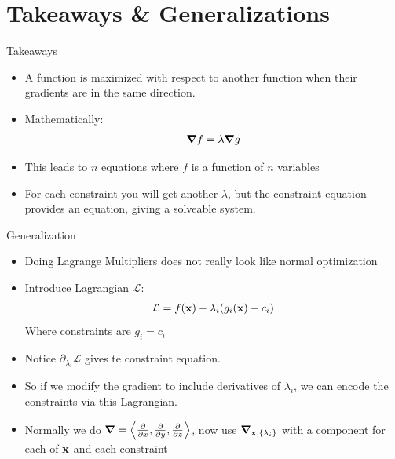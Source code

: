 \documentclass{beamer}
\newcommand{\D}{\partial}
\renewcommand{\L}{\mathcal{L}}
\begin{document}
\section{Takeaways \& Generalizations}
\begin{frame}{Takeaways}
  \begin{itemize}
  \item A function is maximized with respect to another function when their gradients are in the same direction.
  \item Mathematically:
    \begin{align*}
      \grad{f}=\lambda\grad{g}
    \end{align*}
  \item This leads to $n$ equations where $f$ is a function of $n$ variables
  \item For each constraint you will get another $\lambda$, but the constraint equation provides an equation, giving a solveable system. 
  \end{itemize}
\end{frame}
\begin{frame}{Generalization}
  \begin{itemize}
  \item Doing Lagrange Multipliers does not really look like normal optimization
  \item Introduce Lagrangian $\L$:
    \begin{align*}
      \L=f(\vb{x})-\lambda_i(g_i(\vb{x})-c_i)
    \end{align*}
    Where constraints are $g_i=c_i$
  \item Notice $\D_{\lambda_i}\L$ gives te constraint equation.
  \item So if we modify the gradient to include derivatives of $\lambda_i$, we can encode the constraints via this Lagrangian.
  \item Normally we do $\grad=\ev{\pdv{x},\pdv{y},\pdv{z}}$, now use $\grad_{\vb{x},\{\lambda_i\}}$ with a component for each of $\vb{x}$ and each constraint
  \end{itemize}
\end{frame}
\end{document}
